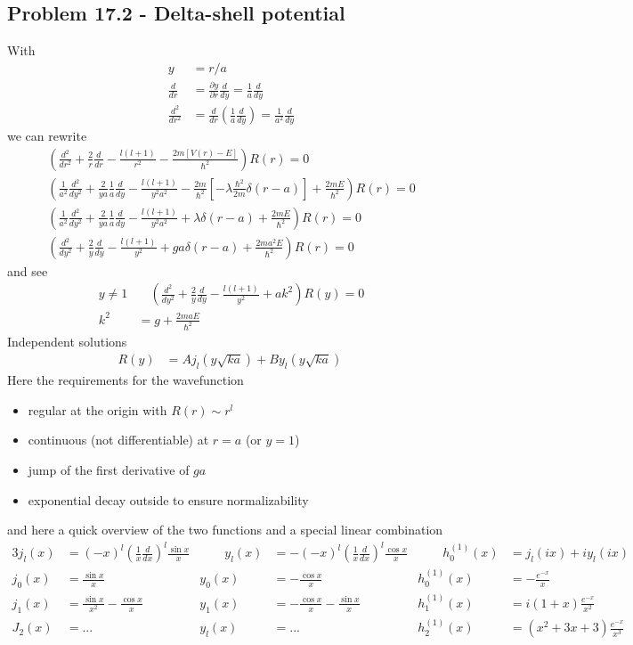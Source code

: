 \documentclass[../main.tex]{subfiles}
\begin{document}
\subsection{Problem 17.2 - Delta-shell potential}
With
\begin{align}
y&=r/a\\
\frac{d}{dr}&=\frac{\partial y}{\partial r}\frac{d}{dy}=\frac{1}{a}\frac{d}{dy}\\
\frac{d^2}{dr^2}&=\frac{d}{dr}\left(\frac{1}{a}\frac{d}{dy}\right)=\frac{1}{a^2}\frac{d}{dy}
\end{align}
we can rewrite
\begin{align}
\left(\frac{d^2}{dr^2}+\frac{2}{r}\frac{d}{dr}-\frac{l(l+1)}{r^2}-\frac{2m[V(r)-E]}{\hbar^2}\right)R(r)=0\\
\left(\frac{1}{a^2}\frac{d^2}{dy^2}+\frac{2}{ya}\frac{1}{a}\frac{d}{dy}-\frac{l(l+1)}{y^2a^2}-\frac{2m}{\hbar^2}\left[-\lambda\frac{\hbar^2}{2m}\delta(r-a)\right]+\frac{2mE}{\hbar^2}\right)R(r)=0\\
\left(\frac{1}{a^2}\frac{d^2}{dy^2}+\frac{2}{ya}\frac{1}{a}\frac{d}{dy}-\frac{l(l+1)}{y^2a^2}+\lambda\delta(r-a)+\frac{2mE}{\hbar^2}\right)R(r)=0\\
\left(\frac{d^2}{dy^2}+\frac{2}{y}\frac{d}{dy}-\frac{l(l+1)}{y^2}+ga\delta(r-a)+\frac{2ma^2E}{\hbar^2}\right)R(r)=0
\end{align}
and see
\begin{align}
y\neq1&\quad \left(\frac{d^2}{dy^2}+\frac{2}{y}\frac{d}{dy}-\frac{l(l+1)}{y^2}+ak^2\right)R(y)=0\\
k^2&=g+\frac{2maE}{\hbar^2}
\end{align}
Independent solutions
\begin{align}
R(y)
&=Aj_l(y\sqrt{ka})+By_l(y\sqrt{ka})\
\end{align}
Here the requirements for the wavefunction
\begin{itemize}
\item regular at the origin with $R(r)\sim r^l$
\item continuous (not differentiable) at $r=a$ (or $y=1$)
\item jump of the first derivative of $ga$
\item exponential decay outside to ensure normalizability
\end{itemize}
and here a quick overview of the two functions and a special linear combination
\begin{alignat*}{3}
j_l(x)&=(-x)^l\left(\frac{1}{x}\frac{d}{dx}\right)^l\frac{\sin x}{x} & \qquad y_l(x)&=-(-x)^l\left(\frac{1}{x}\frac{d}{dx}\right)^l\frac{\cos x}{x} &\qquad  h^{(1)}_0(x)&=j_l(ix)+iy_l(ix)\\
j_0(x)&=\frac{\sin x}{x}                                             & y_0(x)&=-\frac{\cos x}{x}                    & h^{(1)}_0(x)&=-\frac{e^{-x}}{x}\\
j_1(x)&=\frac{\sin x}{x^2}-\frac{\cos x}{x}                          & y_1(x)&=-\frac{\cos x}{x}-\frac{\sin x}{x}   & h^{(1)}_1(x)&=i(1+x)\frac{e^{-x}}{x^2}\\
J_2(x)&=...                                                          & y_l(x)&=...                                  & h^{(1)}_2(x)&=(x^2+3x+3)\frac{e^{-x}}{x^3} 
\end{alignat*} 
\end{document}
